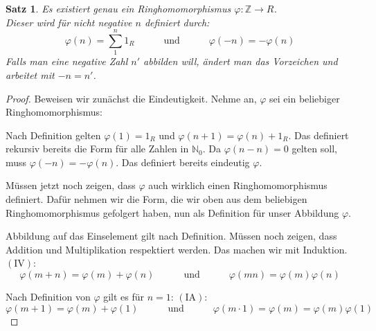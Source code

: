 \documentclass{article}
\newtheorem*{satz}{Satz}
\theoremstyle{definition}
\theoremstyle{remark}
\begin{document}
\begin{satz}
Es existiert genau ein Ringhomomorphismus $\varphi: \mathbb Z \to R$. \\
Dieser wird für nicht negative $n$ definiert durch:
\[\varphi(n)=\sum_1^n 1_R \hspace{3em} \text{und} \hspace{3em} \varphi(-n)=-\varphi(n)\]
Falls man eine negative Zahl $n'$ abbilden will, ändert man das Vorzeichen und arbeitet mit $-n=n'$.
\end{satz}
\begin{proof} Beweisen wir zunächst die Eindeutigkeit. Nehme an, $\varphi$ sei ein beliebiger
Ringhomomorphismus: 

Nach Definition gelten $\varphi(1)=1_R$ und $\varphi(n+1)=\varphi(n)+1_R$.
Das definiert rekursiv bereits die Form für alle Zahlen in $\mathbb N_0$. Da $\varphi(n-n)=0$ gelten soll,
muss $\varphi(-n)=-\varphi(n)$. Das definiert bereits eindeutig $\varphi$.

\vspace{0.7em}
Müssen jetzt noch zeigen, dass $\varphi$ auch wirklich einen Ringhomomorphismus definiert. Dafür nehmen wir die
Form, die wir oben aus dem beliebigen Ringhomomorphismus gefolgert haben, nun als Definition für unser
Abbildung $\varphi$.

\vspace{0.7em}
Abbildung auf das Einselement gilt nach Definition. Müssen noch zeigen, dass Addition und Multiplikation
respektiert werden. Das machen wir mit Induktion.
\flushleft$(\text{IV})$:\vspace{-1.2em}
\[\varphi(m+n)=\varphi(m)+\varphi(n) \hspace{3em} \text{und} \hspace{3em} \varphi(mn)=\varphi(m)\varphi(n)\]

\vspace{0.25em}
Nach Definition von $\varphi$ gilt es für $n=1$:
\vspace{0.25em}
\flushleft$(\text{IA})$:\vspace{-1.2em}
\[\varphi(m+1)=\varphi(m)+\varphi(1) \hspace{3em} \text{und} \hspace{3em} \varphi(m\cdot 1)=\varphi(m)=
\varphi(m)\varphi(1)\]


\end{proof}
\end{document}
